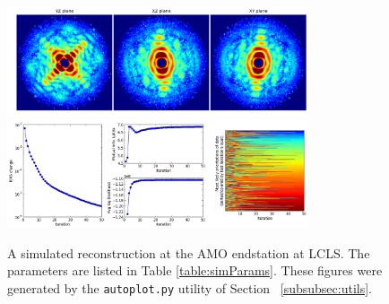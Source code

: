 \documentclass[]{iucr}              %
\begin{document}
\begin{figure}
\caption{A simulated reconstruction at the AMO endstation at LCLS. The parameters are listed in Table \ref{table:simParams}. These figures were generated by the \texttt{autoplot.py} utility of Section ~\ref{subsubsec:utils}.}
\includegraphics[width=3.5in]{figures/amo_low_intens.png} \label{fig:amo_low_intens}
\includegraphics[width=3.5in]{figures/amo_low_log.png} \label{fig:amo_low_log}
\end{figure}
\end{document}
